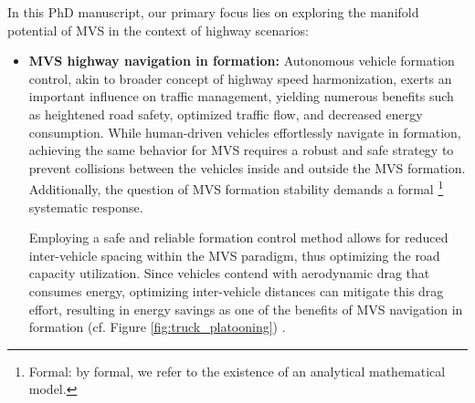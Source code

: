 In this PhD manuscript, our primary focus lies on exploring the manifold potential of MVS in the context of highway scenarios: 
\begin{itemize} %

\item \textbf{MVS highway navigation in formation:} Autonomous vehicle formation control, akin to broader concept of highway speed harmonization, exerts an important influence on traffic management, yielding numerous benefits such as heightened road safety, optimized traffic flow, and decreased energy consumption. While human-driven vehicles effortlessly navigate in formation, achieving the same behavior for MVS requires a robust and safe strategy to prevent collisions between the vehicles inside and outside the MVS formation. Additionally, the question of MVS formation stability demands a formal \footnote{Formal: by formal, we refer to the existence of an analytical mathematical model.} systematic response. 



Employing a safe and reliable formation control method allows for reduced inter-vehicle spacing within the MVS paradigm, thus optimizing the road capacity utilization. Since vehicles contend with aerodynamic drag that consumes energy, optimizing inter-vehicle distances can mitigate this drag effort, resulting in energy savings as one of the benefits of MVS navigation in formation (cf. Figure \ref{fig:truck_platooning}) \cite{zhao2021distributed}\cite{Mechnical_simulation}. 


\end{itemize}
